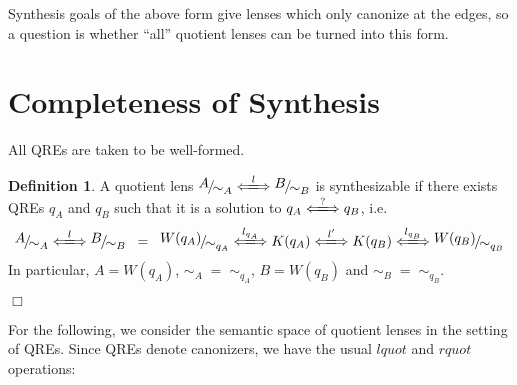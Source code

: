 \documentclass[a4paper,11pt] {article}
\theoremstyle{definition}
\newtheorem{definition}[theorem]{Definition}
\newcommand{\lquot}{\textit{lquot}}
\newcommand{\rquot}{\textit{rquot}}
\newcommand{\lensbetween}[1]{\xLongleftrightarrow{#1}}
\newcommand{\niceFrac}[2]{%
    \raise.5ex\hbox{$#1$}%
    \kern-.1em/\kern-.15em%
    \lower.25ex\hbox{$#2$}}
\begin{document}
Synthesis goals of the above form give lenses which only canonize at
the edges, so a question is whether ``all'' quotient lenses can be
turned into this form.


\section{Completeness of Synthesis}
All QREs are taken to be well-formed.
\begin{definition}
  A quotient lens
  $\niceFrac{A}{\sim_A} \lensbetween{l} \niceFrac{B}{\sim_B}$
  is synthesizable if there exists QREs $q_A$ and $q_B$ such that
  it is a solution to $q_A \lensbetween{?} q_B$, i.e.
  \begin{align*}
    \niceFrac{A}{\sim_A} \lensbetween{l} \niceFrac{B}{\sim_B} \;\; = \;\;
    \niceFrac{W(q_A)}{\sim_{q_A}} \lensbetween{l_{q_A}} K(q_A)
    \lensbetween{l'}
    K(q_B) \lensbetween{l_{q_B}} \niceFrac{W(q_B)}{\sim_{q_B}}
  \end{align*}
  In particular, $A = W(q_A)$, $\sim_A \; = \; \sim_{q_A}$,
  $B = W(q_B)$ and $\sim_B \; = \; \sim_{q_B}$.
  \begin{flushright} $\Box$ \end{flushright}
\end{definition}
For the following, we consider the semantic space of quotient
lenses in the setting of QREs.
Since QREs denote canonizers,
we have the usual $\lquot$ and $\rquot$ operations:
\end{document}
